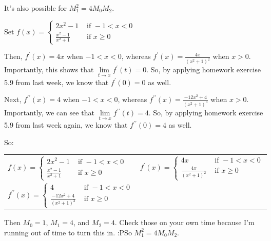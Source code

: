 \documentclass{book}
\newcommand{\pracTwo}{
   \color{Orange}%
   \fontsize{12}{14}\selectfont%
}
\newenvironment{myIndent}{%
   \begin{adjustwidth}{2.5em}{0em}%
}{%
   \end{adjustwidth}%
}
\newcommand{\pprime}{{\prime\prime}}
\newcommand{\retTwo}{\hfill\bigbreak}
\begin{document}
\newpage

It's also possible for $M_1^2 = 4M_0M_2$.

{\begin{myIndent}\pracTwo
   Set $f(x) = \left\{
   \begin{matrix}
      2x^2 - 1 & \text{ if } -1 < x < 0\\
      \frac{x^2 - 1}{x^2 + 1} & \text{ if } x \geq 0\phantom{maaaa}
   \end{matrix}\right.$\retTwo

   Then, $f^\prime(x) = 4x$ when $-1 < x < 0$, whereas $f^\prime(x) = \frac{4x}{(x^2 + 1)^2}$ when $x > 0$.\\ Importantly, this shows that $\lim\limits_{t\rightarrow x}f^\prime(t) = 0$. So, by applying homework exercise\\ 5.9 from last week, we know that $f^\prime(0) = 0$ as well.\retTwo

   Next, $f^\pprime(x) = 4$ when $-1 < x < 0$, whereas $f^\pprime(x) = \frac{-12x^2 + 4}{(x^2 + 1)^3}$ when $x > 0$.\\ Importantly, we can see that $\lim\limits_{t\rightarrow x}f^\pprime(t) = 4$. So, by applying homework exercise\\ 5.9 from last week again, we know that $f^\pprime(0) = 4$ as well.

   So:\\
   \begin{tabular}{l l}
      $f(x) = \left\{
   \begin{matrix}
      2x^2 - 1 & \text{ if } -1 < x < 0\\
      \frac{x^2 - 1}{x^2 + 1} & \text{ if } x \geq 0\phantom{maaaa}
   \end{matrix}\right.$
   & 
   $f^\prime(x) = \left\{
   \begin{matrix}
      4x & \text{ if } -1 < x < 0\\
      \frac{4x}{(x^2 + 1)^2} & \text{ if } x \geq 0\phantom{aamaa}
   \end{matrix}\right.$
   \\ [14pt]
   $f^\pprime(x) = \left\{
   \begin{matrix}
      4 & \text{ if } -1 < x < 0\\
      \frac{-12x^2 + 4}{(x^2 + 1)^3} & \text{ if } x \geq 0\phantom{aamaa}
   \end{matrix}\right.$
   \end{tabular}\retTwo

   Then $M_0 = 1$, $M_1 = 4$, and $M_2 = 4$. Check those on your own time because I'm\\ running out of time to turn this in. :P\retTwo So $M_1^2 = 4M_0M_2$.\retTwo
\end{myIndent}}
\end{document}

